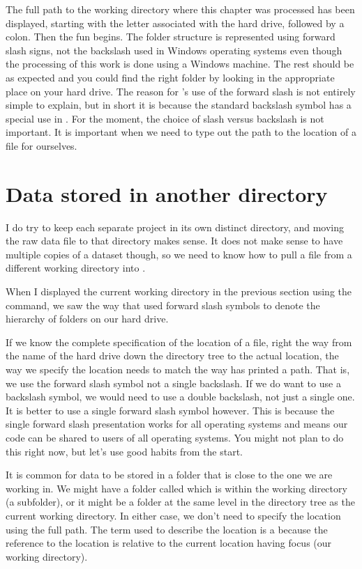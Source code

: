  
The full path to the working directory where this chapter was processed has been displayed, starting with the letter associated with the hard drive, followed by a colon. Then the fun begins. The folder structure is represented using forward slash signs, not the backslash used in Windows operating systems even though the processing of this work is done using a Windows machine. The rest should be as expected and you could find the right folder by looking in the appropriate place on your hard drive. The reason for \R{}'s use of the forward slash is not entirely simple to explain, but in short it is because the standard backslash symbol has a special use  in \R{}. For the moment, the choice of slash versus backslash is not important. It is important when we need to type out the path to the location of a file for ourselves. 
 
 
 
\section{Data stored in another directory} 
 
 
I do try to keep each separate project in its own distinct directory, and moving the raw data file to that directory makes sense. It does not make sense to have multiple copies of a dataset though, so we need to know how to pull a file from a different working directory into \R{}. 
 
When I displayed the current working directory in the previous section using the  command, we saw the way that \R{} used forward slash symbols to denote the hierarchy of folders on our hard drive. 
 
If we know the complete specification of the location of a file, right the way from the name of the hard drive down the directory tree to the actual location, the way we specify the location needs to match the way \R{} has printed a path. That is, we use the forward slash symbol not a single backslash. If we do want to use a backslash symbol, we would need to use a double backslash, not just a single one. It is better to use a single forward slash symbol however. This is because the single forward slash presentation works for all operating systems and means our code can be shared to users of all operating systems. You might not plan to do this right now, but let's use good habits from the start. 
 
It is common for data to be stored in a folder that is close to the one we are working in. We might have a folder called  which is within the working directory (a subfolder), or it might be a folder at the same level in the directory tree as the current working directory. In either case, we don't need to specify the location using the full path. The term used to describe the location is a  because the reference to the location is relative to the current location having focus (our working directory).  
 
